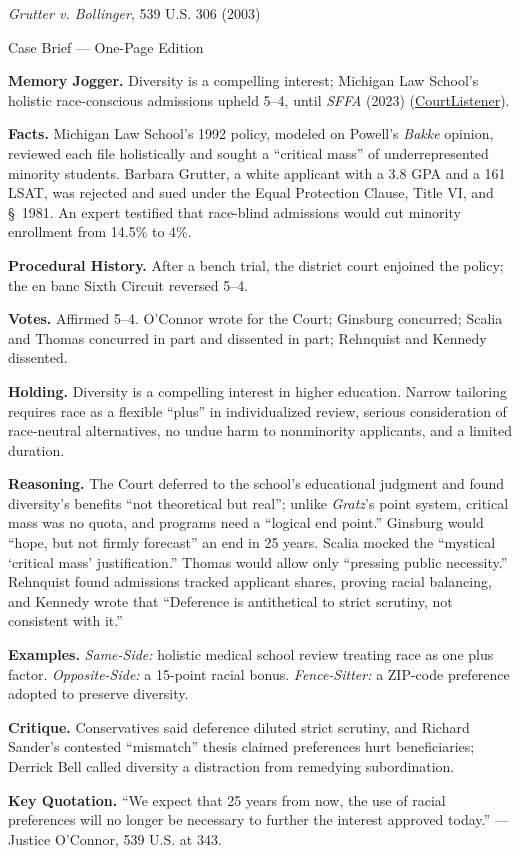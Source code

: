 \documentclass[12pt]{article}
\begin{document}
\begin{center}
{\Large \textit{Grutter v. Bollinger}, 539 U.S. 306 (2003)\par}
\vspace{0.3em}
{\normalsize Case Brief --- One-Page Edition\par}
\end{center}

\textbf{Memory Jogger.} Diversity is a compelling interest; Michigan Law School's holistic race-conscious admissions upheld 5--4, until \textit{SFFA} (2023) (\href{https://www.courtlistener.com/opinion/130155/grutter-v-bollinger/}{CourtListener}).

\textbf{Facts.} Michigan Law School's 1992 policy, modeled on Powell's \textit{Bakke} opinion, reviewed each file holistically and sought a ``critical mass'' of underrepresented minority students. Barbara Grutter, a white applicant with a 3.8 GPA and a 161 LSAT, was rejected and sued under the Equal Protection Clause, Title VI, and \S~1981. An expert testified that race-blind admissions would cut minority enrollment from 14.5\% to 4\%.

\textbf{Procedural History.} After a bench trial, the district court enjoined the policy; the en banc Sixth Circuit reversed 5--4.

\textbf{Votes.} Affirmed 5--4. O'Connor wrote for the Court; Ginsburg concurred; Scalia and Thomas concurred in part and dissented in part; Rehnquist and Kennedy dissented.

\textbf{Holding.} Diversity is a compelling interest in higher education. Narrow tailoring requires race as a flexible ``plus'' in individualized review, serious consideration of race-neutral alternatives, no undue harm to nonminority applicants, and a limited duration.

\textbf{Reasoning.} The Court deferred to the school's educational judgment and found diversity's benefits ``not theoretical but real''; unlike \textit{Gratz}'s point system, critical mass was no quota, and programs need a ``logical end point.'' Ginsburg would ``hope, but not firmly forecast'' an end in 25 years. Scalia mocked the ``mystical `critical mass' justification.'' Thomas would allow only ``pressing public necessity.'' Rehnquist found admissions tracked applicant shares, proving racial balancing, and Kennedy wrote that ``Deference is antithetical to strict scrutiny, not consistent with it.''

\textbf{Examples.} \emph{Same-Side:} holistic medical school review treating race as one plus factor. \emph{Opposite-Side:} a 15-point racial bonus. \emph{Fence-Sitter:} a ZIP-code preference adopted to preserve diversity.

\textbf{Critique.} Conservatives said deference diluted strict scrutiny, and Richard Sander's contested ``mismatch'' thesis claimed preferences hurt beneficiaries; Derrick Bell called diversity a distraction from remedying subordination.

\textbf{Key Quotation.} ``We expect that 25 years from now, the use of racial preferences will no longer be necessary to further the interest approved today.'' --- Justice O'Connor, 539 U.S. at 343.
\end{document}
